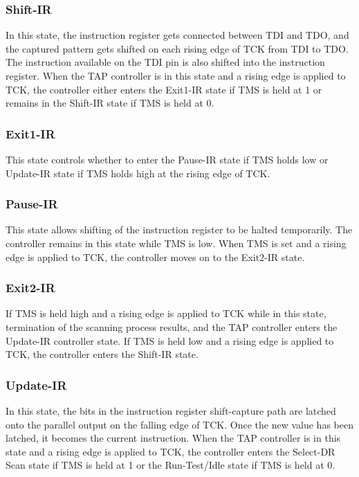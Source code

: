 \subsubsection{Shift-IR}
\label{subsubsec:shift-ir}
In this state, the instruction register gets connected between TDI and TDO, and the captured pattern gets shifted on each rising edge of TCK from TDI to TDO. The instruction available on the TDI pin is also shifted into the instruction register. When the TAP controller is in this state and a rising edge is applied to TCK, the controller either enters the Exit1-IR state if TMS is held at 1 or remains in the Shift-IR state if TMS is held at 0.

\subsubsection{Exit1-IR}
\label{subsubsec:exit1-ir}
This state controls whether to enter the Pause-IR state if TMS holds low or Update-IR state if TMS holds high at the rising edge of TCK.

\subsubsection{Pause-IR}
\label{subsubsec:pause-ir}
This state allows shifting of the instruction register to be halted temporarily. The controller remains in this state while TMS is low. When TMS is set and a rising edge is applied to TCK, the controller moves on to the Exit2-IR state.

\subsubsection{Exit2-IR}
\label{subsubsec:exit2-ir}
If TMS is held high and a rising edge is applied to TCK while in this state, termination of the scanning process results, and the TAP controller enters the Update-IR controller state. If TMS is held low and a rising edge is applied to TCK, the controller enters the Shift-IR state.

\subsubsection{Update-IR}
\label{subsubsec:update-ir}
In this state, the bits in the instruction register shift-capture path are latched onto the parallel output on the falling edge of TCK. Once the new value has been latched, it becomes the current instruction. When the TAP controller is in this state and a rising edge is applied to TCK, the controller enters the Select-DR Scan state if TMS is held at 1 or the Run-Test/Idle state if TMS is held at 0.

